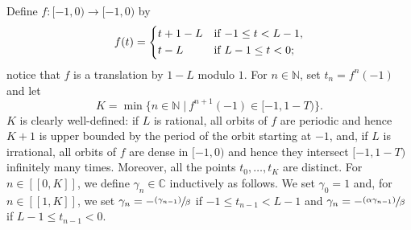 \documentclass[10pt]{article}
\newcommand{\psfrac}[2]{\sfrac{(#1)}{#2}}
\newcommand{\llbracket}{[\![}
\newcommand{\rrbracket}{]\!]}
\theoremstyle{plain}
\theoremstyle{definition}
\newcommand{\suchthat}{\;|\:}
\numberwithin{equation}{section}\numberwithin{figure}{section}\emergencystretch=3em
\begin{document}
Define $f: [-1, 0) \to [-1, 0)$ by
\[
f(t) = \begin{dcases*}
t + 1 - L& if $-1 \leq t < L - 1$,\\
t - L& if $L - 1 \leq t < 0$; 
\end{dcases*}
\]
notice that $f$ is a translation by $1 - L$ modulo $1$. For $n \in \mathbb N$, set $t_n = f^n(-1)$ and let
\[
K = \min\{n \in \mathbb N \suchthat f^{n+1}(-1) \in [-1, 1 - T)\}.
\]
$K$ is clearly well-defined: if $L$ is rational, all orbits of $f$ are periodic and hence $K+1$ is upper bounded by the period of the orbit starting at $-1$, and, if $L$ is irrational, all orbits of $f$ are dense in $[-1, 0)$ and hence they intersect $[-1, 1-T)$ infinitely many times. Moreover, all the points $t_0, \dots, t_K$ are distinct. For $n \in \llbracket 0, K\rrbracket$, we define $\gamma_n \in \mathbb C$ inductively as follows. We set $\gamma_0 = 1$ and, for $n \in \llbracket 1, K\rrbracket$, we set $\gamma_n = -\psfrac{\gamma_{n-1}}{\beta}$ if $-1 \leq t_{n-1} < L - 1$ and $\gamma_n = -\psfrac{\alpha \gamma_{n-1}}{\beta}$ if $L - 1 \leq t_{n-1} < 0$.
\end{document}
